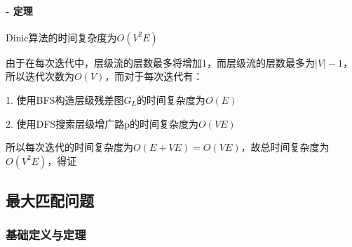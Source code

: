 \documentclass[UTF8]{ctexart}
\begin{document}
\begin{enumerate}
            \vspace{1cm}


            \paragraph{- 定理 }

            Dinic算法的时间复杂度为$O(V^2E)$

            由于在每次迭代中，层级流的层数最多将增加1，而层级流的层数最多为$|V|-1$，所以迭代次数为$O(V)$，而对于每次迭代有：

            1. 使用BFS构造层级残差图$G_L$的时间复杂度为$O(E)$

            2. 使用DFS搜索层级增广路p的时间复杂度为$O(VE)$

            所以每次迭代的时间复杂度为$O(E+VE)=O(VE)$，故总时间复杂度为$O(V^2E)$，得证


\end{enumerate}

\vspace{1cm}


\subsection{最大匹配问题}

\subsubsection{基础定义与定理}
\end{document}
